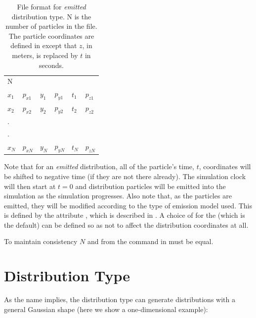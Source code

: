 \begin{table}[!htb]
  \begin{center}\footnotesize
    \caption{File format for \emph{emitted}  distribution type. N is the number
    of particles in the file. The particle coordinates are defined in 
    except that $z$, in meters, is replaced by $t$ in seconds.}
    \label{tab:fromfileemitfileformat}
    \begin{tabular}{llllll}
      \hline
      N & & & & & \\
      $x_{1}$ & $p_{x1}$ & $y_{1}$ & $p_{y1}$ & $t_{1}$ & $p_{z1}$ \\
      $x_{2}$ & $p_{x2}$ & $y_{2}$ & $p_{y2}$ & $t_{2}$ & $p_{z2}$ \\
      . & & & & & \\
      . & & & & & \\
      $x_{N}$ & $p_{xN}$ & $y_{N}$ & $p_{yN}$ & $t_{N}$ & $p_{zN}$ \\
      \hline
    \end{tabular}
  \end{center}
\end{table}

Note that for an \emph{emitted}  distribution, all of the particle's time, $t$, coordinates
will be shifted to negative time (if they are not there already). The simulation clock will then start at $t = 0$
and distribution particles will be emitted into the simulation as the simulation progresses. Also note that,
as the particles are emitted, they will be modified according to the type of emission model used. This is defined
by the attribute , which is described in . A choice of
 for the  (which is the default) can be defined so as not to affect the
distribution coordinates at all.


To maintain consistency $N$ and  from the  command in  must be equal.

\section{ Distribution Type}
\label{sec:gaussdisttype}
\FloatBarrier

As the name implies, the  distribution type can generate distributions with a general
Gaussian shape (here we show a one-dimensional example):

